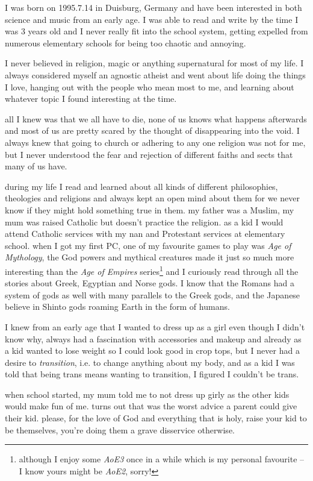 \documentclass[12pt]{report}
\theoremstyle{definition}
\theoremstyle{remark}
\begin{document}
I was born on 1995.7.14 in Duisburg, Germany and have been interested in both science and music from an early age. I was able to read and write by the time I was 3 years old and I never really fit into the school system, getting expelled from numerous elementary schools for being too chaotic and annoying.

I never believed in religion, magic or anything supernatural for most of my life. I always considered myself an agnostic atheist and went about life doing the things I love, hanging out with the people who mean most to me, and learning about whatever topic I found interesting at the time.

all I knew was that we all have to die, none of us knows what happens afterwards and most of us are pretty scared by the thought of disappearing into the void. I always knew that going to church or adhering to any one religion was not for me, but I never understood the fear and rejection of different faiths and sects that many of us have.

during my life I read and learned about all kinds of different philosophies, theologies and religions and always kept an open mind about them for we never know if they might hold something true in them. my father was a Muslim, my mum was raised Catholic but doesn't practice the religion. as a kid I would attend Catholic services with my nan and Protestant services at elementary school. when I got my first PC, one of my favourite games to play was \emph{Age of Mythology}, the God powers and mythical creatures made it just so much more interesting than the \emph{Age of Empires} series\footnote{although I enjoy some \emph{AoE3} once in a while which is my personal favourite – I know yours might be \emph{AoE2}, sorry!} and I curiously read through all the stories about Greek, Egyptian and Norse gods. I know that the Romans had a system of gods as well with many parallels to the Greek gods, and the Japanese believe in Shinto gods roaming Earth in the form of humans.

I knew from an early age that I wanted to dress up as a girl even though I didn't know why, always had a fascination with accessories and makeup and already as a kid wanted to lose weight so I could look good in crop tops, but I never had a desire to \emph{transition}, i.e. to change anything about my body, and as a kid I was told that being trans means wanting to transition, I figured I couldn't be trans.

when school started, my mum told me to not dress up girly as the other kids would make fun of me. turns out that was the worst advice a parent could give their kid. please, for the love of God and everything that is holy, raise your kid to be themselves, you're doing them a grave disservice otherwise.
\end{document}
